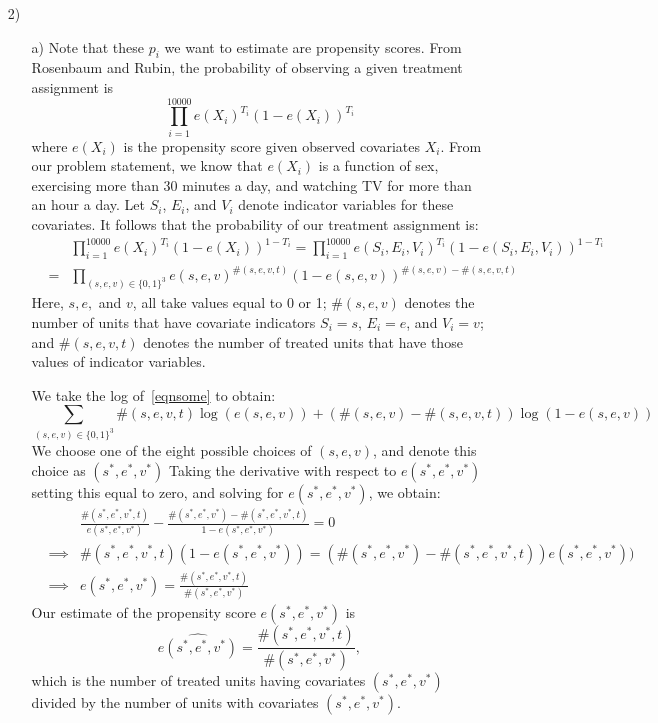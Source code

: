 \documentclass{article}
\begin{document}
\begin{itemize}
  \item[2)]
    \begin{itemize}
    \item[a)]
      Note that these $p_i$ we want to estimate are
      propensity scores.
      From Rosenbaum and Rubin, 
      the probability of observing a given treatment assignment is
      $$
        \prod_{i=1}^{10000} e(X_i)^{T_i}(1-e(X_i))^{T_i}
      $$
      where $e(X_i)$ is the propensity score given observed covariates $X_i$.
      From our problem statement, we know that $e(X_i)$ is a function
      of sex, exercising more than 30 minutes a day, 
      and watching TV for more than an hour a day.
      Let $S_i$, $E_i$, and $V_i$ denote indicator variables for these covariates.
      It follows that the probability of our treatment assignment is:
      \begin{eqnarray}
        && \prod_{i=1}^{10000} e(X_i)^{T_i}(1-e(X_i))^{1-T_i} = 
        \prod_{i=1}^{10000} e(S_i,E_i,V_i)^{T_i}(1-e(S_i,E_i,V_i))^{1-T_i}\nonumber \\
        & = & \prod_{(s,e,v) \in \{0,1\}^3} e(s,e,v)^{\#(s,e,v,t)}
              (1-e(s,e,v))^{\#(s,e,v)- \#(s,e,v,t)} \label{eqnsome}
      \end{eqnarray}
      Here, $s,e,$ and $v$, all take values equal to 0 or 1;
       $\#(s,e,v)$ denotes the number of units that have covariate indicators
       $S_i = s$, $E_i = e$, and $V_i = v$; and
      $\#(s,e,v,t)$ denotes the number of treated units that have those values
      of indicator variables.
      
      We take the log of~\eqref{eqnsome} to obtain:
      $$
        \sum_{(s,e,v) \in \{0,1\}^3}  \#(s,e,v,t)\log(e(s,e,v)) +
          (\#(s,e,v)- \#(s,e,v,t))\log
              (1-e(s,e,v))
      $$
      We choose one of the eight possible choices of $(s,e,v)$,
      and denote this choice as $(s^*,e^*,v^*)$
      Taking the derivative with respect to $e(s^*,e^*,v^*)$ 
      setting this equal to zero, and solving for $e(s^*,e^*,v^*)$,
      we obtain:
      \begin{eqnarray*}
       &&\frac{ \#(s^*,e^*,v^*,t)}{e(s^*,e^*,v^*)}- \frac{\#(s^*,e^*,v^*)- \#(s^*,e^*,v^*,t)}{1-e(s^*,e^*,v^*)} = 0 \\
       &\implies & \#(s^*,e^*,v^*,t)(1-e(s^*,e^*,v^*)) = (\#(s^*,e^*,v^*)- \#(s^*,e^*,v^*,t))e(s^*,e^*,v^*)) \\
       &\implies & e(s^*,e^*,v^*) = \frac{\#(s^*,e^*,v^*,t)}{\#(s^*,e^*,v^*)}
      \end{eqnarray*}
      Our estimate of the propensity score $e(s^*,e^*,v^*)$ is
      $$
        \widehat {e(s^*,e^*,v^*)} =  \frac{\#(s^*,e^*,v^*,t)}{\#(s^*,e^*,v^*)},
      $$
      which is the number of treated units having covariates $(s^*,e^*,v^*)$ divided by
      the number of units with covariates $(s^*,e^*,v^*).$
      

\end{itemize}
\end{itemize}
\end{document}
